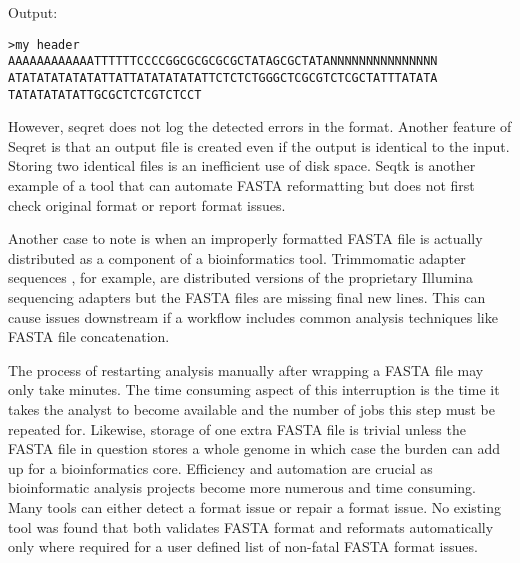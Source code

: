 Output:

\begin{verbatim}
>my header
AAAAAAAAAAAATTTTTTCCCCGGCGCGCGCGCTATAGCGCTATANNNNNNNNNNNNNNN
ATATATATATATATTATTATATATATATTCTCTCTGGGCTCGCGTCTCGCTATTTATATA
TATATATATATTGCGCTCTCGTCTCCT
\end{verbatim}

However, seqret does not log the detected errors in the format. Another feature of Seqret is that an output file is created even if the output is identical to the input. Storing two identical files is an inefficient use of disk space. Seqtk \cite{Li2013} is another example of a tool that can automate FASTA reformatting but does not first check original format or report format issues. 

Another case to note is when an improperly formatted FASTA file is actually distributed as a component of a bioinformatics tool. Trimmomatic adapter sequences \cite{bolger2014trimmomatic}, for example, are distributed versions of the proprietary Illumina sequencing adapters but the FASTA files are missing final new lines. This can cause issues downstream if a workflow includes common analysis techniques like FASTA file concatenation. 

The process of restarting analysis manually after wrapping a FASTA file may only take minutes. The time consuming aspect of this interruption is the time it takes the analyst to become available and the number of jobs this step must be repeated for. Likewise, storage of one extra FASTA file is trivial unless the FASTA file in question stores a whole genome in which case the burden can add up for a bioinformatics core. Efficiency and automation are crucial as bioinformatic analysis projects become more numerous and time consuming. Many tools can either detect a format issue or repair a format issue. No existing tool was found that both validates FASTA format and reformats automatically only where required for a user defined list of non-fatal FASTA format issues.
  
  
  
  